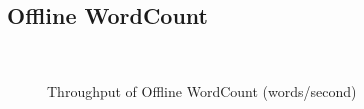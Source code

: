 \subsection{Offline WordCount}
\begin{figure}[t!]
  \begin{center}
  ~
   \caption{Throughput of Offline WordCount (words/second)}
   \label{fig:offline_throughput}
  \end{center}
\end{figure}

